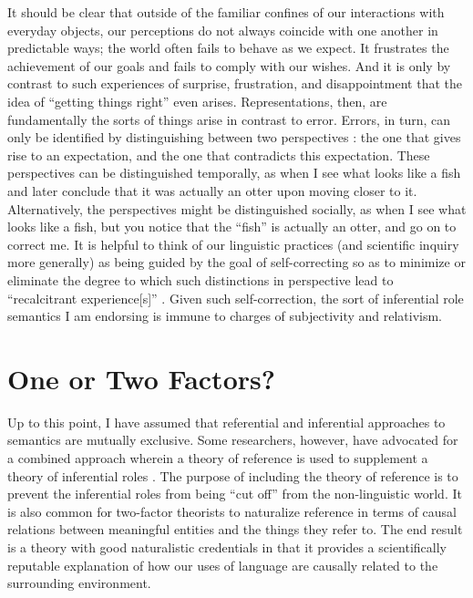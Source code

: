 It should be clear that outside of the familiar confines of our interactions with everyday objects, our perceptions do not always coincide with one another in predictable ways; the world often fails to behave as we expect. It frustrates the achievement of our goals and fails to comply with our wishes. And it is only by contrast to such experiences of surprise, frustration, and disappointment that the idea of ``getting things right'' even arises. Representations, then, are fundamentally the sorts of things arise in contrast to error. Errors, in turn, can only be identified by distinguishing between two perspectives \citep[see][]{Brandom:1994}: the one that gives rise to an expectation, and the one that contradicts this expectation. These perspectives can be distinguished temporally, as when I see what looks like a fish and later conclude that it was actually an otter upon moving closer to it. Alternatively, the perspectives might be distinguished socially, as when I see what looks like a fish, but you notice that the ``fish'' is actually an otter, and go on to correct me. It is helpful to think of our linguistic practices (and scientific inquiry more generally) as being guided by the goal of self-correcting so as to minimize or eliminate the degree to which such distinctions in perspective lead to ``recalcitrant experience[s]'' \citep[][p. 33]{Misak:2013}. Given such self-correction, the sort of inferential role semantics I am endorsing is immune to charges of subjectivity and relativism. 

\section{One or Two Factors?}

Up to this point, I have assumed that referential and inferential approaches to semantics are mutually exclusive. Some researchers, however, have advocated for a combined approach wherein a theory of reference is used to supplement a theory of inferential roles \citep[e.g.,][]{Eliasmith:2000,Block:1986}. The purpose of including the theory of reference is to prevent the inferential roles from being ``cut off'' from the non-linguistic world. It is also common for two-factor theorists to naturalize reference in terms of causal relations between meaningful entities and the things they refer to. The end result is a theory with good naturalistic credentials in that it provides a scientifically reputable explanation of how our uses of language are causally related to the surrounding environment.  

